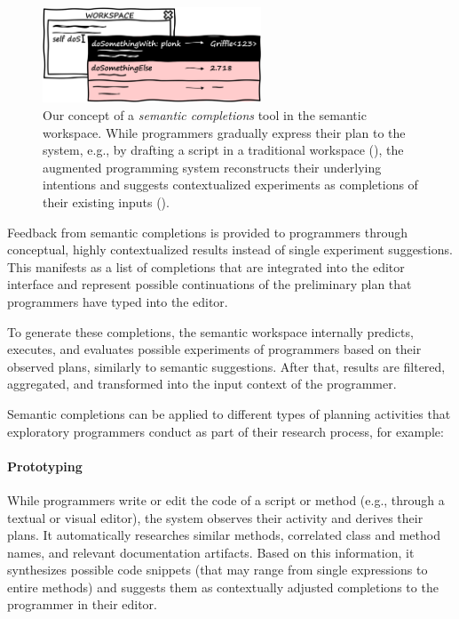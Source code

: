 \begin{figure}
	\centering
	\includegraphics[width=0.58\textwidth]{02_workspace/completions.png}
	\caption[Our concept of a \emph{semantic completions} tool in the semantic workspace.]{
		Our concept of a \emph{semantic completions} tool in the semantic workspace.
		While programmers gradually express their plan to the system, e.g., by drafting a script in a traditional workspace (\bold{\textcolor{gray}{gray}}), the augmented programming system reconstructs their underlying intentions and suggests contextualized experiments as completions of their existing inputs (\bold{\textcolor[HTML]{c00000}{red}}).
	}
	\label{fig:approach/workspace/completions}
\end{figure}

Feedback from semantic completions is provided to programmers through conceptual, highly contextualized results instead of single experiment suggestions.
This manifests as a list of completions that are integrated into the editor interface and represent possible continuations of the preliminary plan that programmers have typed into the editor.

To generate these completions, the semantic workspace internally predicts, executes, and evaluates possible experiments of programmers based on their observed plans, similarly to semantic suggestions.
After that, results are filtered, aggregated, and transformed into the input context of the programmer.

Semantic completions can be applied to different types of planning activities that exploratory programmers conduct as part of their research process, for example:

\paragraph{Prototyping}
While programmers write or edit the code of a script or method (e.g., through a textual or visual editor), the system observes their activity and derives their plans.
It automatically researches similar methods, correlated class and method names, and relevant documentation artifacts.
Based on this information, it synthesizes possible code snippets (that may range from single expressions to entire methods) and suggests them as contextually adjusted completions to the programmer in their editor.

